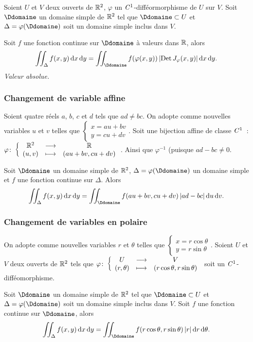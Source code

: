 \begin{theo}
  Soient $U$ et $V$ deux ouverts de $\mathbb{R}^2$, $\varphi$ un $\mathit{C}^1$-difféormorphisme de $U$ sur $V$. Soit $\Ddomaine$ un domaine simple de $\mathbb{R}^2$ tel que $\Ddomaine \subset U$ et $\Delta = \varphi(\Ddomaine)$ soit un domaine simple inclus dans $V$.

  Soit $f$ une fonction continue sur $\Ddomaine$ à valeurs dans $\mathbb{R}$, alors
  \begin{equation}
    \iint_\Delta f(x,y)\diff x \diff y = \iint_\Ddomaine f(\varphi(x,y)) \abs{\Det J_\varphi(x,y)}\diff x \diff y.
  \end{equation}
  \emph{Valeur absolue.}
\end{theo}

\subsubsection{Changement de variable affine}

\begin{theo}
  Soient quatre réels $a$, $b$, $c$ et $d$ tels que $ad \neq bc$. On adopte comme nouvelles variables $u$ et $v$ telles que $\begin{cases} x=au+bv \\ y=cu+dv \end{cases}$. Soit une bijection affine de classe $\mathit{C}^1$~: $\varphi\colon \left\{\begin{array}{ccc} \mathbb{R}^2 & \longrightarrow &\mathbb{R}\\ (u,v) & \longmapsto & (au+bv, cu+dv) \end{array} \right.$. Ainsi que $\varphi^{-1}$ (puisque $ad-bc\neq 0$.

Soit $\Ddomaine$ un domaine simple de $\mathbb{R}^2$, $\Delta=\varphi(\Ddomaine)$ un domaine simple et $f$ une fonction continue sur $\Delta$. Alors
\begin{equation}
  \iint_\Delta f(x,y)\diff x \diff y = \iint_\Ddomaine f(au+bv, cu+dv) \abs{ad-bc}\diff u \diff v.
\end{equation}
\end{theo}

\subsubsection{Changement de variables en polaire}

\begin{theo}
  On adopte comme nouvelles variables $r$ et $\theta$ telles que $\begin{cases} x=r\cos\theta \\ y=r\sin\theta \end{cases}$. Soient $U$ et $V$ deux ouverts de $\mathbb{R}^2$ tels que $\varphi\colon \left\{\begin{array}{ccc} U & \longrightarrow &V\\ (r, \theta) & \longmapsto & (r\cos\theta, r\sin\theta) \end{array} \right.$ soit un $\mathit{C}^1$-difféomorphisme.

Soit $\Ddomaine$ un domaine simple de $\mathbb{R}^2$ tel que $\Ddomaine \subset U$ et $\Delta=\varphi(\Ddomaine)$ soit un domaine simple inclus dans $V$. Soit $f$ une fonction continue sur $\Ddomaine$, alors
\begin{equation}
   \iint_\Delta f(x,y)\diff x \diff y = \iint_\Ddomaine f(r\cos\theta, r\sin\theta) \abs{r}\diff r \diff \theta.
\end{equation}
\end{theo}

